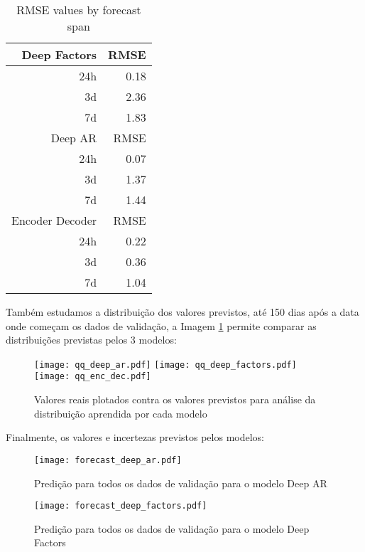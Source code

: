 \begin{center}
\begin{table}[htbp]
\caption{\label{tab:rmse}
RMSE values by forecast span}
\centering
\begin{tabular}{rr}
\hline
Deep Factors & RMSE\\
\hline
24h & 0.18\\
3d & 2.36\\
7d & 1.83\\
\hline
Deep AR & RMSE\\
\hline
24h & 0.07\\
3d & 1.37\\
7d & 1.44\\
\hline
Encoder Decoder & RMSE\\
\hline
24h & 0.22\\
3d & 0.36\\
7d & 1.04\\
\end{tabular}
\end{table}
\end{center}


Também estudamos a distribuição dos valores previstos, até 150 dias após a data onde começam os dados de validação, a Imagem \ref{fig:distr} permite comparar as distribuições previstas pelos 3 modelos:

\begin{figure}[H]
\label{fig:distr}
\centering
\texttt{[image: qq\_deep\_ar.pdf]} \hfill
\texttt{[image: qq\_deep\_factors.pdf]} \hfill
\texttt{[image: qq\_enc\_dec.pdf]} 
\caption{Valores reais plotados contra os valores previstos para análise da distribuição aprendida por cada modelo} 
\end{figure}


Finalmente, os valores e incertezas previstos pelos modelos:


\begin{figure}[H]
  \label{fig:fordeepar}
  \centering
\texttt{[image: forecast\_deep\_ar.pdf]} 
\caption{Predição para todos os dados de validação para o modelo Deep AR}
\end{figure}

\begin{figure}[H]
  \label{fig:fordeepfactors}
  \centering
\texttt{[image: forecast\_deep\_factors.pdf]} 
\caption{Predição para todos os dados de validação para o modelo Deep Factors}
\end{figure}

